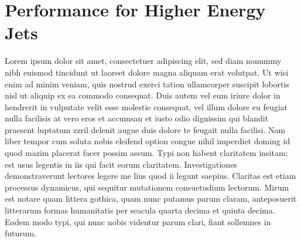 \documentclass[final,3p,times,twocolumn]{elsarticle}
\begin{document}


\section{Performance for Higher Energy Jets}
Lorem ipsum dolor sit amet, consectetuer adipiscing elit, sed diam nonummy nibh euismod tincidunt ut laoreet dolore magna aliquam erat volutpat. Ut wisi enim ad minim veniam, quis
nostrud exerci tation ullamcorper suscipit lobortis nisl ut aliquip ex ea commodo consequat. Duis autem vel eum iriure dolor in hendrerit in vulputate velit esse molestie consequat,
vel illum dolore eu feugiat nulla facilisis at vero eros et accumsan et iusto odio dignissim qui blandit praesent luptatum zzril delenit augue duis dolore te feugait nulla facilisi.
Nam liber tempor cum soluta nobis eleifend option congue nihil imperdiet doming id quod mazim placerat facer possim assum. Typi non habent claritatem insitam; est usus legentis in
iis qui facit eorum claritatem. Investigationes demonstraverunt lectores legere me lius quod ii legunt saepius. Claritas est etiam processus dynamicus, qui sequitur mutationem
consuetudium lectorum. Mirum est notare quam littera gothica, quam nunc putamus parum claram, anteposuerit litterarum formas humanitatis per seacula quarta decima et quinta
decima. Eodem modo typi, qui nunc nobis videntur parum clari, fiant sollemnes in futurum.
\end{document}
